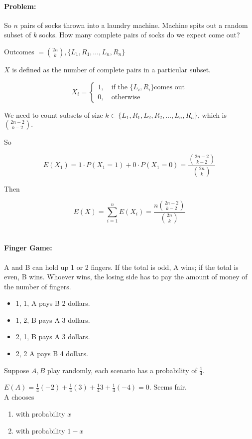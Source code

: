 \documentclass[a4paper, 11pt, twoside]{article}
\begin{document}
\paragraph{Problem:} So $n$ pairs of socks thrown into a laundry machine. Machine spits out a random subset of $k$ socks. How many complete pairs of socks do we expect come out?

Outcomes $={2n\choose k}, \{L_1, R_1, \dots, L_n, R_n\}$

$X$ is defined as the number of complete pairs in a particular subset.

\[X_i=\begin{cases}1,\ &\text{if the \{$L_i, R_i$\} comes out}\\ 0,\ &\text{otherwise}\end{cases}\]

We need to count subsets of size $k\subset \{L_1, R_1,L_2, R_2,\dots, L_n, R_n\}$, which is ${2n-2 \choose k-2}.$

So

\[E(X_1)=1\cdot P(X_1=1)+0\cdot P(X_1=0)=\frac{{2n-2 \choose k-2}}{{2n\choose k}}\]

Then

\[E(X) = \sum^n_{i=1}E(X_i)=\frac{n{2n-2 \choose k-2}}{{2n\choose k}}\]\\

\paragraph{Finger Game:} A and B can hold up 1 or 2 fingers. If the total is odd, A wins; if the total is even, B wins. Whoever wins, the losing side has to pay the amount of money of the number of fingers.

\begin{itemize}
	\item 1, 1, A pays B 2 dollars.
	\item 1, 2, B pays A 3 dollars.
	\item 2, 1, B pays A 3 dollars.
	\item 2, 2 A pays B 4 dollars.
\end{itemize}

Suppose $A, B$ play randomly, each scenario has a probability of $\frac{1}{4}$.

$E(A)= \frac{1}{4}(-2)+\frac{1}{4}(3)+\frac{1}{4}3+\frac{1}{4}(-4)=0$. Seems fair.\\

A chooses \begin{enumerate}
	\item with probability $x$
	\item with probability $1-x$
\end{enumerate}
\end{document}
